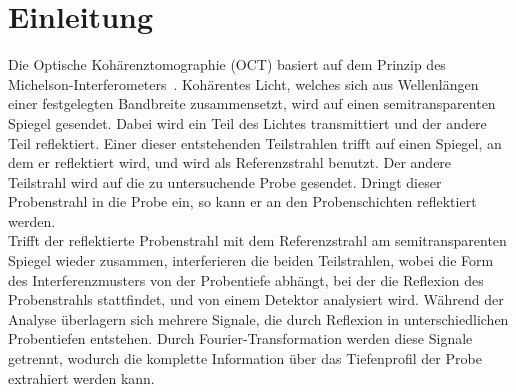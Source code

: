 \section{Einleitung}

Die Optische Kohärenztomographie (OCT) basiert auf dem Prinzip des Michelson-In\-ter\-fe\-ro\-me\-ters~\cite{OCT}. Kohärentes Licht, welches sich aus Wellenlängen einer festgelegten Bandbreite zusammensetzt, wird auf einen semitransparenten Spiegel gesendet.  Dabei wird ein Teil des Lichtes transmittiert und der andere Teil reflektiert. Einer dieser entstehenden Teilstrahlen trifft auf einen Spiegel, an dem er reflektiert wird, und wird als Referenzstrahl benutzt. Der andere Teilstrahl wird auf die zu untersuchende Probe gesendet. Dringt dieser Probenstrahl in die Probe ein, so kann er an den Probenschichten reflektiert werden. \\
Trifft der reflektierte Probenstrahl mit dem Referenzstrahl am semitransparenten Spiegel wieder zusammen, interferieren die beiden Teilstrahlen, wobei die Form des Interferenzmusters von der Probentiefe abhängt, bei der die Reflexion des Probenstrahls stattfindet, und von einem Detektor analysiert wird. Während der Analyse überlagern sich mehrere Signale, die durch Reflexion in unterschiedlichen Probentiefen entstehen. Durch Fourier-Transformation werden diese Signale getrennt, wodurch die komplette Information über das Tiefenprofil der Probe extrahiert werden kann. \\
